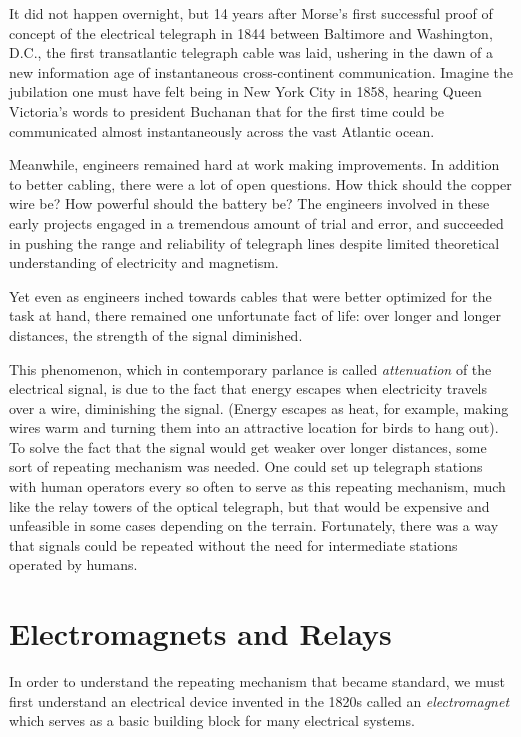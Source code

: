 \documentclass[UTF8]{book}
\begin{document}
\begin{CJK}{UTF8}{gbsn}
It did not happen overnight, but 14 years after Morse's first successful proof of concept of the electrical telegraph in 1844 between Baltimore and Washington, D.C., the first transatlantic telegraph cable was laid, ushering in the dawn of a new information age of instantaneous cross-continent communication. Imagine the jubilation one must have felt being in New York City in 1858, hearing Queen Victoria's words to president Buchanan that for the first time could be communicated almost instantaneously across the vast Atlantic ocean.

Meanwhile, engineers remained hard at work making improvements. In addition to better cabling, there were a lot of open questions. How thick should the copper wire be? How powerful should the battery be? The engineers involved in these early projects engaged in a tremendous amount of trial and error, and succeeded in pushing the range and reliability of telegraph lines despite limited theoretical understanding of electricity and magnetism.

Yet even as engineers inched towards cables that were better optimized for the task at hand, there remained one unfortunate fact of life: over longer and longer distances, the strength of the signal diminished.

This phenomenon, which in contemporary parlance is called \emph{attenuation} of the electrical signal, is due to the fact that energy escapes when electricity travels over a wire, diminishing the signal. (Energy escapes as heat, for example, making wires warm and turning them into an attractive location for birds to hang out). To solve the fact that the signal would get weaker over longer distances, some sort of repeating mechanism was needed. One could set up telegraph stations with human operators every so often to serve as this repeating mechanism, much like the relay towers of the optical telegraph, but that would be expensive and unfeasible in some cases depending on the terrain. Fortunately, there was a way that signals could be repeated without the need for intermediate stations operated by humans.

\section{Electromagnets and Relays}

In order to understand the repeating mechanism that became standard, we must first understand an electrical device invented in the 1820s called an \emph{electromagnet} which serves as a basic building block for many electrical systems.


\end{CJK}
\end{document}
